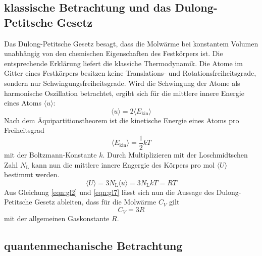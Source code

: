 \subsection{klassische Betrachtung und das Dulong-Petitsche Gesetz}
\label{sec:klassisch}

Das Dulong-Petitsche Gesetz besagt, dass die Molwärme bei konstantem Volumen unabhängig von den chemischen Eigenschaften des Festkörpers ist.
Die entsprechende Erklärung liefert die klassiche Thermodynamik.
Die Atome im Gitter eines Festkörpers besitzen keine Translations- und Rotationsfreiheitsgrade, sondern nur Schwingungsfreiheitsgrade.
Wird die Schwingung der Atome als harmonische Oszillation betrachtet, ergibt sich für die mittlere innere Energie eines Atoms $\langle u \rangle$:
\begin{equation}
  \langle u \rangle = 2 \langle E_\text{kin} \rangle
  \label{eqn:gl5}
\end{equation}
Nach dem Äquipartitionstheorem ist die kinetische Energie eines Atoms pro Freiheitsgrad
\begin{equation}
  \langle E_\text{kin} \rangle = \frac{1}{2} k T
  \label{eqn:gl6}
\end{equation}
mit der Boltzmann-Konstante $k$.
Durch Multiplizieren mit der Loschmidtschen Zahl $N_\text{L}$ kann nun die mittlere innere Engergie des Körpers pro \si{\mol} $\langle U \rangle$ bestimmt werden.
\begin{equation}
  \langle U \rangle = 3 N_\text{L} \langle u \rangle = 3 N_\text{L} k T = R T
  \label{eqn:gl7}
\end{equation}
Aus Gleichung \eqref{eqn:gl2} und \eqref{eqn:gl7} lässt sich nun die Aussage des Dulong-Petitsche Gesetz ableiten, dass für die Molwärme $C_V$ gilt
\begin{equation}
  C_V = 3 R
  \label{eqn:gl8}
\end{equation}
mit der allgemeinen Gaskonstante $R$.

\subsection{quantenmechanische Betrachtung}
\label{sec:quantenmechanisch}

